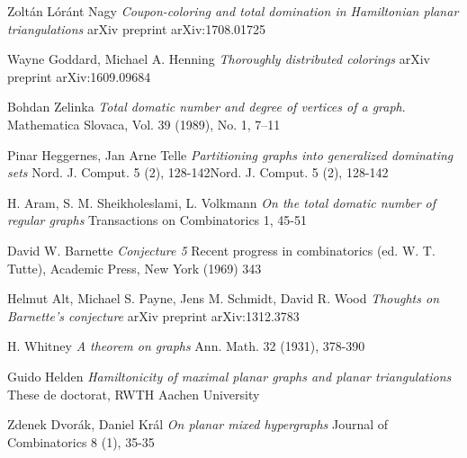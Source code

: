 \begin{thebibliography}{9}

Zoltán Lóránt Nagy
\textit{Coupon-coloring and total domination in Hamiltonian planar triangulations}
arXiv preprint arXiv:1708.01725

Wayne Goddard, Michael A. Henning
\textit{Thoroughly distributed colorings}
arXiv preprint arXiv:1609.09684

Bohdan Zelinka
\textit{Total domatic number and degree of vertices of a graph}.
Mathematica Slovaca, Vol. 39 (1989), No. 1, 7--11

Pinar Heggernes, Jan Arne Telle
\textit{Partitioning graphs into generalized dominating sets}
Nord. J. Comput. 5 (2), 128-142Nord. J. Comput. 5 (2), 128-142

H. Aram, S. M. Sheikholeslami, L. Volkmann
\textit{On the total domatic number of regular graphs}
Transactions on Combinatorics 1, 45-51

David W. Barnette
\textit{Conjecture 5}
Recent progress in combinatorics (ed. W. T. Tutte), Academic Press, New York (1969) 343

Helmut Alt, Michael S. Payne, Jens M. Schmidt, David R. Wood
\textit{Thoughts on Barnette's conjecture}
arXiv preprint arXiv:1312.3783

H. Whitney
\textit{A theorem on graphs}
Ann. Math. 32 (1931), 378-390

Guido Helden
\textit{Hamiltonicity of maximal planar graphs and planar triangulations}
These de doctorat, RWTH Aachen University

Zdenek Dvorák, Daniel Král
\textit{On planar mixed hypergraphs}
Journal of Combinatorics 8 (1), 35-35

\end{thebibliography}
